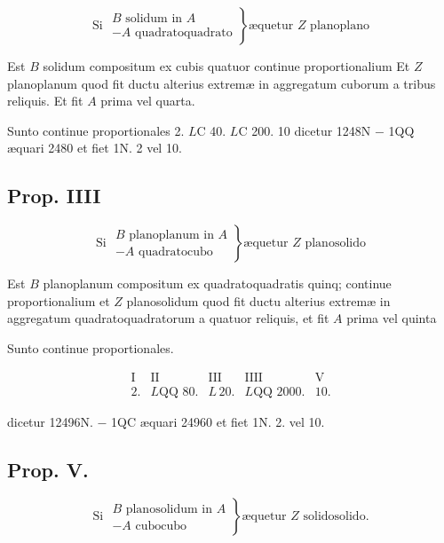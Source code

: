 \documentclass[11pt,a4paper]{article}
\begin{document}
\[ \text{Si } \left.\begin{array}{l} B \text{ solidum in } A \\ - A \text{ quadratoquadrato} \end{array}\right\} \text{æquetur } Z \text{ planoplano} \]

Est $B$ solidum compositum ex cubis quatuor continue proportionalium Et $Z$ planoplanum quod fit ductu alterius extremæ in aggregatum cuborum a tribus reliquis. Et fit $A$ prima vel quarta.

Sunto continue proportionales 2. $L$C 40. $L$C 200. 10 dicetur 1248N $-$ 1QQ æquari 2480 et fiet 1N. 2 vel 10.

\subsection*{Prop. IIII}

\[ \text{Si } \left.\begin{array}{l} B \text{ planoplanum in } A \\ - A \text{ quadratocubo} \end{array}\right\} \text{æquetur } Z \text{ planosolido} \]

Est $B$ planoplanum compositum ex quadratoquadratis quinq; continue proportionalium et $Z$ planosolidum quod fit ductu alterius extremæ in aggregatum quadratoquadratorum a quatuor reliquis, et fit $A$ prima vel quinta

Sunto continue proportionales.

\[ \begin{array}{ccccc} \text{I} & \text{II} & \text{III} & \text{IIII} & \text{V} \\ 2. & L\text{QQ } 80. & L\,20. & L\text{QQ } 2000. & 10. \end{array} \]

dicetur 12496N. $-$ 1QC æquari 24960 et fiet 1N. 2. vel 10.

\subsection*{Prop. V.}

\[ \text{Si } \left.\begin{array}{l} B \text{ planosolidum in } A \\ - A \text{ cubocubo} \end{array}\right\} \text{æquetur } Z \text{ solidosolido.} \]
\end{document}
